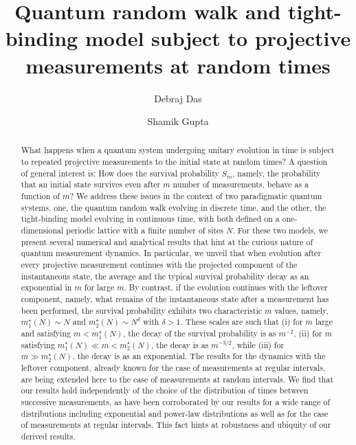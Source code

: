 \documentclass[12pt]{iopart}
\begin{document}
\title{Quantum random walk and tight-binding model subject to projective measurements at random
times}
\author{Debraj Das}
\address{Department of Engineering Mathematics, University of
Bristol, Bristol BS8 1TW, United Kingdom}
\author{Shamik Gupta}
\address{Department of Physics, Ramakrishna Mission Vivekananda
Educational and Research Institute, Belur Math, Howrah 711202, India}
\begin{abstract}
        What happens when a quantum system undergoing unitary evolution in time is subject
to repeated projective measurements to the initial state at random times? A question of general
interest is: How does the survival probability $S_m$, namely, the
probability that an initial state survives even after $m$ number of
measurements, behave as a
function of $m$? We address these issues in the context of two paradigmatic quantum systems, one, the quantum random walk
        evolving in discrete time, and the other, the tight-binding model evolving in continuous time,  with both defined on a one-dimensional periodic lattice with a finite number of sites $N$.  For these two models,  we present several numerical and analytical results that hint at the curious
nature of quantum measurement dynamics. In particular, we unveil that when
evolution after every projective measurement continues with the
projected component of the instantaneous state, the average and the typical survival probability decay as an exponential in
$m$ for large $m$.  By contrast, if the evolution continues with
        the leftover component, namely, what remains of the
        instantaneous state after a measurement has been performed, the survival probability exhibits two characteristic $m$ values, namely, $m_1^\star(N) \sim N$ and $m_2^\star(N) \sim N^\delta$ with $\delta >1$. These scales are such that (i) for $m$ large and satisfying $m < m_1^\star(N)$, the decay of the survival probability is as $m^{-2}$,  (ii) for $m$ satisfying $m_1^\star(N) \ll m <m_2^\star(N)$, the decay is as $m^{-3/2
        }$,  while (iii) for $m \gg m_2^\star(N)$, the decay is as an exponential.  The results for the dynamics with the leftover component, already known for the case of measurements at regular intervals, are being extended here to the case of measurements at random intervals.  We find that our results 
hold independently of the choice of the distribution of times between
successive measurements,  as have been corroborated by our results for a wide range of distributions including exponential and power-law distributions as well as for the case of measurements at regular intervals. This fact hints at robustness and ubiquity of our derived results. 
\end{abstract}
\maketitle
\end{document}
